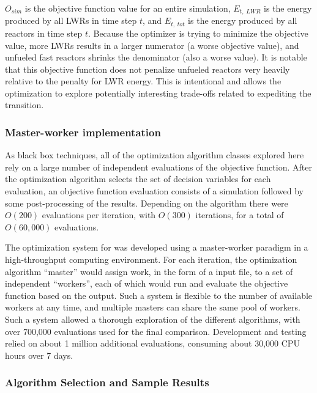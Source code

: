 $O_{sim}$ is the objective function value for an entire simulation,
$E_{t,\;LWR}$ is the energy produced by all \gls{LWR}s in time step $t$, and
$E_{t,\;tot}$ is the energy produced by all reactors in time step $t$.
Because the optimizer is trying to minimize the objective value, more
\gls{LWR}s results in a larger numerator (a worse objective value), and
unfueled fast reactors shrinks the denominator (also a worse value).  It is
notable that this objective function does not penalize unfueled reactors very
heavily relative to the penalty for \gls{LWR} energy.  This is intentional and
allows the optimization to explore potentially interesting trade-offs related
to expediting the transition.


\subsubsection{Master-worker implementation}

As black box techniques, all of the optimization algorithm classes explored
here rely on a large number of independent evaluations of the objective
function.  After the optimization algorithm selects the set of decision
variables for each evaluation, an objective function evaluation consists of a
\Cyclus{} simulation followed by some post-processing of the results.
Depending on the algorithm there were $O(200)$ evaluations per iteration, with
$O(300)$ iterations, for a total of $O(60,000)$ evaluations.  

The optimization system for \Cyclus{} was developed using a master-worker
paradigm in a high-throughput computing environment.  For each iteration, the
optimization algorithm ``master'' would assign work, in the form of a
\Cyclus{} input file, to a set of independent ``workers'', each of which would
run \Cyclus{} and evaluate the objective function based on the output.  Such a
system is flexible to the number of available workers at any time, and multiple
masters can share the same pool of workers.  Such a system allowed a thorough
exploration of the different algorithms, with over 700,000 \Cyclus{}
evaluations used for the final comparison.  Development and testing relied on
about 1 million additional \Cyclus{} evaluations, consuming about 30,000 CPU
hours over 7 days.

\subsubsection{Algorithm Selection and Sample Results}

